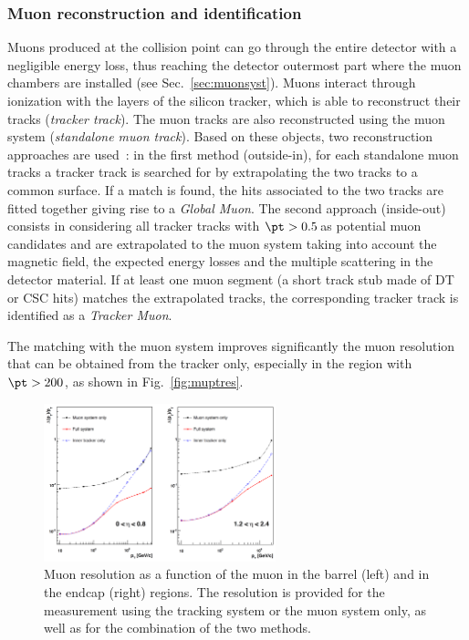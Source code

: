 \subsubsection{Muon reconstruction and identification}
Muons produced at the collision point can go through the entire detector with a negligible energy loss, thus reaching the detector outermost part where the muon chambers are installed (see Sec.~\ref{sec:muonsyst}). Muons interact through ionization with the layers of the silicon tracker, which is able to reconstruct their tracks (\emph{tracker track}). The muon tracks are also reconstructed using the muon system (\emph{standalone muon track}). Based on these objects, two reconstruction approaches are used~\cite{Chatrchyan:2012xi}: in the first method (outside-in), for each standalone muon tracks a tracker track is searched for by extrapolating the two tracks to a common surface. If a match is found, the hits associated to the two tracks are fitted together giving rise to a \emph{Global Muon}. The second approach (inside-out) consists in considering all tracker tracks with $\pt > 0.5$\,\GeV as potential muon candidates and are extrapolated to the muon system taking into account the magnetic field, the expected energy losses and the multiple scattering in the detector material. If at least one muon segment (a short track stub made of DT or CSC hits) matches the extrapolated tracks, the corresponding tracker track is identified as a \emph{Tracker Muon}.

The matching with the muon system improves significantly the muon \pt resolution that can be obtained from the tracker only, especially in the region with $\pt > 200$\GeV, as shown in Fig.~\ref{fig:muptres}. 
\begin{figure}[htb]
\centering
\includegraphics[width=0.6\textwidth]{images/muptres.png}
\caption{Muon \pt resolution as a function of the muon \pt in the barrel (left) and in the endcap (right) regions. The resolution is provided for the measurement using the tracking system or the muon system only, as well as for the combination of the two methods.}\label{fig:muptrese}
\end{figure}

